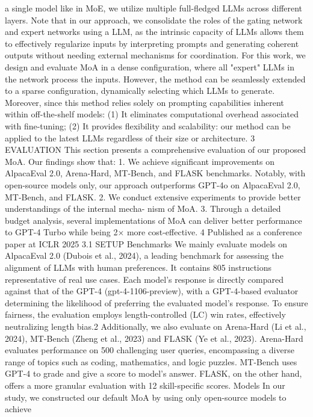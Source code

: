 a single model like in MoE, we utilize multiple full-fledged LLMs across different layers. Note that in
our approach, we consolidate the roles of the gating network and expert networks using a LLM, as the
intrinsic capacity of LLMs allows them to effectively regularize inputs by interpreting prompts and
generating coherent outputs without needing external mechanisms for coordination. For this work, we
design and evaluate MoA in a dense configuration, where all "expert" LLMs in the network process
the inputs. However, the method can be seamlessly extended to a sparse configuration, dynamically
selecting which LLMs to generate.
Moreover, since this method relies solely on prompting capabilities inherent within off-the-shelf
models: (1) It eliminates computational overhead associated with fine-tuning; (2) It provides flexibility
and scalability: our method can be applied to the latest LLMs regardless of their size or architecture.
3
EVALUATION
This section presents a comprehensive evaluation of our proposed MoA. Our findings show that:
1. We achieve significant improvements on AlpacaEval 2.0, Arena-Hard, MT-Bench, and
FLASK benchmarks. Notably, with open-source models only, our approach outperforms
GPT-4o on AlpacaEval 2.0, MT-Bench, and FLASK.
2. We conduct extensive experiments to provide better understandings of the internal mecha-
nism of MoA.
3. Through a detailed budget analysis, several implementations of MoA can deliver better
performance to GPT-4 Turbo while being 2× more cost-effective.
4
Published as a conference paper at ICLR 2025
3.1
SETUP
Benchmarks
We mainly evaluate models on AlpacaEval 2.0 (Dubois et al., 2024), a leading
benchmark for assessing the alignment of LLMs with human preferences. It contains 805 instructions
representative of real use cases. Each model’s response is directly compared against that of the GPT-4
(gpt-4-1106-preview), with a GPT-4-based evaluator determining the likelihood of preferring
the evaluated model’s response. To ensure fairness, the evaluation employs length-controlled (LC)
win rates, effectively neutralizing length bias.2
Additionally, we also evaluate on Arena-Hard (Li et al., 2024), MT-Bench (Zheng et al., 2023)
and FLASK (Ye et al., 2023). Arena-Hard evaluates performance on 500 challenging user queries,
encompassing a diverse range of topics such as coding, mathematics, and logic puzzles. MT-Bench
uses GPT-4 to grade and give a score to model’s answer. FLASK, on the other hand, offers a more
granular evaluation with 12 skill-specific scores.
Models
In our study, we constructed our default MoA by using only open-source models to achieve
